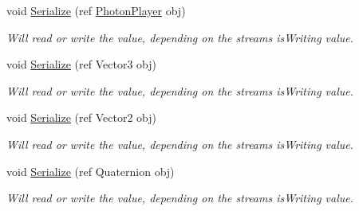 \begin{DoxyCompactItemize}
void \hyperlink{class_photon_stream_af7d4afc02408fb47b41e28b8f920be35}{Serialize} (ref \hyperlink{class_photon_player}{Photon\+Player} obj)
\begin{DoxyCompactList}\small\item\em Will read or write the value, depending on the stream\textquotesingle{}s is\+Writing value. \end{DoxyCompactList}\item 
void \hyperlink{class_photon_stream_a0a74157c27454d59c9ebcd2f12480611}{Serialize} (ref Vector3 obj)
\begin{DoxyCompactList}\small\item\em Will read or write the value, depending on the stream\textquotesingle{}s is\+Writing value. \end{DoxyCompactList}\item 
void \hyperlink{class_photon_stream_a03bcbb2ade3cc109364416476083da0d}{Serialize} (ref Vector2 obj)
\begin{DoxyCompactList}\small\item\em Will read or write the value, depending on the stream\textquotesingle{}s is\+Writing value. \end{DoxyCompactList}\item 
void \hyperlink{class_photon_stream_a8ba68f5108d3ab8bbc69d7b88aa661da}{Serialize} (ref Quaternion obj)
\begin{DoxyCompactList}\small\item\em Will read or write the value, depending on the stream\textquotesingle{}s is\+Writing value. \end{DoxyCompactList}\end{DoxyCompactItemize}
